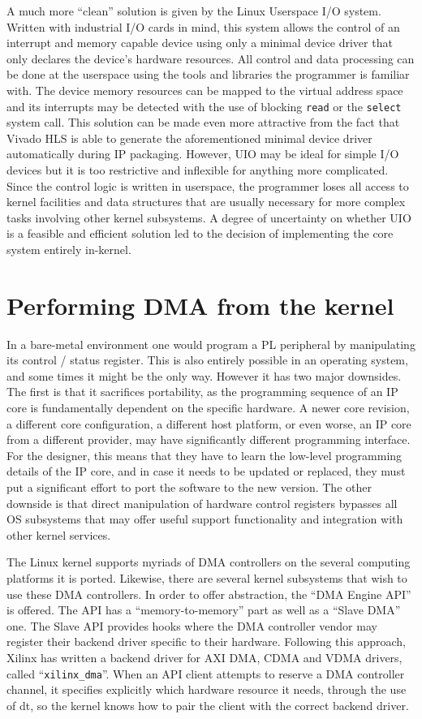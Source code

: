 A much more ``clean'' solution is given by the Linux Userspace I/O system. Written with industrial I/O cards
in mind, this system allows the control of an interrupt and memory capable device using only
a minimal device driver that only declares the device's hardware resources. All control and data processing
can be done at the userspace using the tools and libraries the programmer is familiar with. 
The device memory resources can be mapped to the virtual address space
and its interrupts may be detected with the use of blocking \texttt{read} or the \texttt{select} system call.
This solution can be made even more attractive from the fact that Vivado HLS is able to generate
the aforementioned minimal device driver automatically during IP packaging.
However, UIO may be ideal for simple I/O devices but it is too restrictive and inflexible for anything more complicated.
Since the control logic is written in userspace, the programmer loses all access to kernel facilities
and data structures that are usually necessary for more complex tasks involving other kernel subsystems.
A degree of uncertainty on whether UIO is a feasible and efficient solution led to the decision
of implementing the core system entirely in-kernel.

\section{Performing DMA from the kernel}

In a bare-metal environment one would program a PL peripheral by manipulating its control / status register.
This is also entirely possible in an operating system, and some times it might be the only way.
However it has two major downsides. The first is that it sacrifices portability, 
as the programming sequence of an IP core is fundamentally dependent on the specific hardware.
A newer core revision, a different core configuration, 
a different host platform, or even worse, an IP core from a different
provider, may have significantly different programming interface. For the designer, this means that
they have to learn the low-level programming details of the IP core, and in case it needs to be
updated or replaced, they must put a significant effort to port the software to the new version.
The other downside is that direct manipulation of hardware control registers bypasses all OS
subsystems that may offer useful support functionality and integration with other kernel services.

The Linux kernel supports myriads of DMA controllers on the several computing platforms it is ported.
Likewise, there are several kernel subsystems that wish to use these DMA controllers.
In order to offer abstraction, the ``DMA Engine API'' is offered. The API has a
``memory-to-memory'' part as well as a ``Slave DMA'' one.
The Slave API provides hooks where the DMA controller vendor may register their backend driver 
specific to their hardware. Following this approach, Xilinx
has written a backend driver for AXI DMA, CDMA and VDMA drivers, called ``\texttt{xilinx\_dma}''.
When an API client attempts to reserve a DMA controller channel, it specifies explicitly
which hardware resource it needs, through the use of \gls{dt}, 
so the kernel knows how to pair the client with the correct backend driver.

